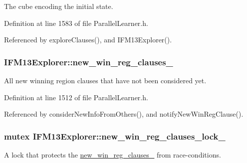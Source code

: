The cube encoding the initial state. 



Definition at line 1583 of file Parallel\-Learner.\-h.



Referenced by explore\-Clauses(), and I\-F\-M13\-Explorer().

\hypertarget{classIFM13Explorer_a712b3dc6c099b1e3697e7b8877e0cd90}{
\subsubsection[{new\-\_\-win\-\_\-reg\-\_\-clauses\-\_\-}]{ I\-F\-M13\-Explorer\-::new\-\_\-win\-\_\-reg\-\_\-clauses\-\_\-\hspace{0.3cm}{\ttfamily [protected]}}}\label{classIFM13Explorer_a712b3dc6c099b1e3697e7b8877e0cd90}


All new winning region clauses that have not been considered yet. 



Definition at line 1512 of file Parallel\-Learner.\-h.



Referenced by consider\-New\-Info\-From\-Others(), and notify\-New\-Win\-Reg\-Clause().

\hypertarget{classIFM13Explorer_a2e2722cb76399e087f62445b959ff5ed}{
\subsubsection[{new\-\_\-win\-\_\-reg\-\_\-clauses\-\_\-lock\-\_\-}]{\setlength{\rightskip}{0pt plus 5cm}mutex I\-F\-M13\-Explorer\-::new\-\_\-win\-\_\-reg\-\_\-clauses\-\_\-lock\-\_\-\hspace{0.3cm}{\ttfamily [protected]}}}\label{classIFM13Explorer_a2e2722cb76399e087f62445b959ff5ed}


A lock that protects the \hyperlink{classIFM13Explorer_a712b3dc6c099b1e3697e7b8877e0cd90}{new\-\_\-win\-\_\-reg\-\_\-clauses\-\_\-} from race-\/conditions. 

